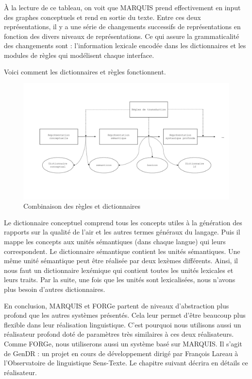 À la lecture de ce tableau, on voit que MARQUIS prend effectivement en input des graphes conceptuels et rend en sortie du texte. Entre ces deux représentations, il y a une série de  changements successifs de représentations en fonction des divers niveaux de représentations. Ce qui assure la grammaticalité des changements sont : l'information lexicale encodée dans les dictionnaires et les modules de règles qui modélisent chaque interface. 

Voici comment les dictionnaires et règles fonctionnent.
\begin{figure}[htb]
	\centering
	\includegraphics[width=1\textwidth, trim = {0cm 0cm 0cm 0cm},clip]{ch2/figs/module.pdf}
	\caption{Combinaison des règles et dictionnaires}
	\label{fig:reglesdict}
\end{figure}

Le dictionnaire conceptuel comprend tous les concepts utiles à la génération des rapports sur la qualité de l'air et les autres termes généraux du langage. Puis il mappe les concepts aux unités sémantiques (dans chaque langue) qui leurs correspondent. Le dictionnaire sémantique contient les unités sémantiques. Une même unité sémantique peut être réalisée par deux lexèmes différents. Ainsi, il nous faut un dictionnaire lexémique qui contient toutes les unités lexicales et leurs traits. Par la suite, une fois que les unités sont lexicalisées, nous n'avons plus besoin d'autres dictionnaires. 

En conclusion, MARQUIS et FORGe partent de niveaux d'abstraction plus profond que les autres systèmes présentés. Cela leur permet d'être beaucoup plus flexible dans leur réalisation linguistique. C'est pourquoi nous utilisons aussi un réalisateur profond doté de paramètres très similaires à ces deux réalisateurs. Comme FORGe, nous utiliserons aussi un système basé sur MARQUIS. Il s'agit de GenDR \citep{lareau18}: un projet en cours de développement dirigé par François Lareau à l’Observatoire de linguistique Sens-Texte. Le chapitre suivant décrira en détails ce réalisateur.